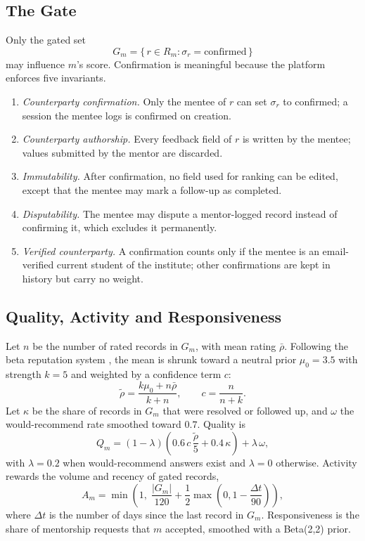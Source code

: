 \documentclass[conference]{IEEEtran}
\begin{document}
\subsection{The Gate}
Only the gated set
\begin{equation}
G_m=\{\,r\in R_m:\sigma_r=\text{confirmed}\,\}
\label{eq:gate}
\end{equation}
may influence $m$'s score. Confirmation is meaningful because the platform enforces five invariants.
\begin{enumerate}
\item[I1:] \emph{Counterparty confirmation.} Only the mentee of $r$ can set $\sigma_r$ to confirmed; a session the mentee logs is confirmed on creation.
\item[I2:] \emph{Counterparty authorship.} Every feedback field of $r$ is written by the mentee; values submitted by the mentor are discarded.
\item[I3:] \emph{Immutability.} After confirmation, no field used for ranking can be edited, except that the mentee may mark a follow-up as completed.
\item[I4:] \emph{Disputability.} The mentee may dispute a mentor-logged record instead of confirming it, which excludes it permanently.
\item[I5:] \emph{Verified counterparty.} A confirmation counts only if the mentee is an email-verified current student of the institute; other confirmations are kept in history but carry no weight.
\end{enumerate}

\subsection{Quality, Activity and Responsiveness}
Let $n$ be the number of rated records in $G_m$, with mean rating $\bar\rho$. Following the beta reputation system \cite{josang2002}, the mean is shrunk toward a neutral prior $\mu_0=3.5$ with strength $k=5$ and weighted by a confidence term $c$:
\begin{equation}
\tilde\rho=\frac{k\mu_0+n\bar\rho}{k+n},\qquad c=\frac{n}{n+k}.
\label{eq:shrink}
\end{equation}
Let $\kappa$ be the share of records in $G_m$ that were resolved or followed up, and $\omega$ the would-recommend rate smoothed toward $0.7$. Quality is
\begin{equation}
Q_m=(1-\lambda)\left(0.6\,c\,\frac{\tilde\rho}{5}+0.4\,\kappa\right)+\lambda\,\omega ,
\label{eq:quality}
\end{equation}
with $\lambda=0.2$ when would-recommend answers exist and $\lambda=0$ otherwise. Activity rewards the volume and recency of gated records,
\begin{equation}
A_m=\min\!\left(1,\;\frac{|G_m|}{120}+\frac12\max\!\left(0,1-\frac{\Delta t}{90}\right)\right),
\label{eq:activity}
\end{equation}
where $\Delta t$ is the number of days since the last record in $G_m$. Responsiveness is the share of mentorship requests that $m$ accepted, smoothed with a Beta(2,2) prior.
\end{document}
